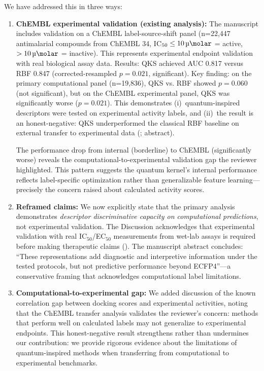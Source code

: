 \documentclass[11pt]{article}
\begin{document}
We have addressed this in three ways:
\begin{enumerate}[label=\alph*),leftmargin=1.6em]
\item \textbf{ChEMBL experimental validation (existing analysis):} The manuscript includes 
validation on a ChEMBL label-source-shift panel (n=22,447 antimalarial compounds from ChEMBL 34, 
IC$_{50} \leq \SI{10}{\micro\molar}$ = active, $> \SI{10}{\micro\molar}$ = inactive). This 
represents experimental endpoint validation with real biological assay data. Results: QKS achieved 
AUC 0.817 versus RBF 0.847 (corrected-resampled $p=0.021$, significant). Key finding: on the 
primary computational panel (n=19,836), QKS vs. RBF showed $p=0.060$ (not significant), but on 
the ChEMBL experimental panel, QKS was significantly worse ($p=0.021$). This demonstrates 
(i)~quantum-inspired descriptors were tested on experimental activity labels, and 
(ii)~the result is an honest-negative: QKS underperformed the classical RBF baseline on 
external transfer to experimental data (; abstract).

The performance drop from internal (borderline) to ChEMBL (significantly worse) reveals the 
computational-to-experimental validation gap the reviewer highlighted. This pattern suggests 
the quantum kernel's internal performance reflects label-specific optimization rather than 
generalizable feature learning—precisely the concern raised about calculated activity scores.

\item \textbf{Reframed claims:} We now explicitly state that the primary analysis demonstrates 
\textit{descriptor discriminative capacity on computational predictions}, not experimental 
validation. The Discussion acknowledges that experimental validation with real IC$_{50}$/EC$_{50}$ 
measurements from wet-lab assays is required before making therapeutic claims (). 
The manuscript abstract concludes: ``These representations add diagnostic and interpretive 
information under the tested protocols, but not predictive performance beyond ECFP4''—a 
conservative framing that acknowledges computational label limitations.

\item \textbf{Computational-to-experimental gap:} We added discussion of the known correlation 
gap between docking scores and experimental activities, noting that the ChEMBL transfer analysis 
validates the reviewer's concern: methods that perform well on calculated labels may not 
generalize to experimental endpoints. This honest-negative result strengthens rather than 
undermines our contribution: we provide rigorous evidence about the limitations of quantum-inspired 
methods when transferring from computational to experimental benchmarks.
\end{enumerate}
\end{document}
